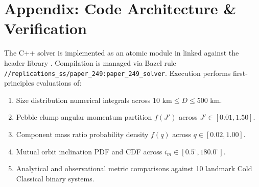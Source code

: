 \documentclass[11pt,a4paper]{article}
\begin{document}
\section*{Appendix: Code Architecture \& Verification}
The C++ solver is implemented as an atomic module in  linked against the header library . Compilation is managed via Bazel rule \texttt{//replications\_ss/paper\_249:paper\_249\_solver}. Execution performs first-principles evaluations of:
\begin{enumerate}
    \item Size distribution numerical integrals across $10\text{ km} \le D \le 500\text{ km}$.
    \item Pebble clump angular momentum partition $f(J')$ across $J' \in [0.01, 1.50]$.
    \item Component mass ratio probability density $f(q)$ across $q \in [0.02, 1.00]$.
    \item Mutual orbit inclination PDF and CDF across $i_m \in [0.5^\circ, 180.0^\circ]$.
    \item Analytical and observational metric comparisons against 10 landmark Cold Classical binary systems.
\end{enumerate}
\end{document}
